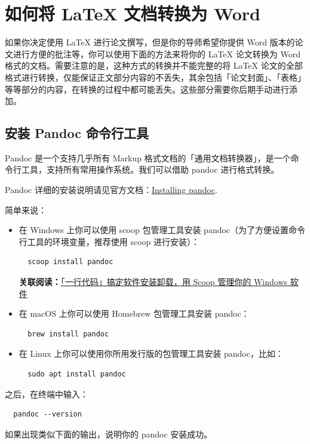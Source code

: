 \section{如何将 {\LaTeX} 文档转换为 Word}

如果你决定使用 {\LaTeX} 进行论文撰写，但是你的导师希望你提供 Word 版本的论文进行方便的批注等，你可以使用下面的方法来将你的 {\LaTeX} 论文转换为 Word 格式的文档。需要注意的是，这种方式的转换并不能完整的将 {\LaTeX} 论文的全部格式进行转换，仅能保证正文部分内容的不丢失，其余包括「论文封面」、「表格」等等部分的内容，在转换的过程中都可能丢失。这些部分需要你后期手动进行添加。

\subsection{安装 Pandoc 命令行工具}

Pandoc 是一个支持几乎所有 Markup 格式文档的「通用文档转换器」，是一个命令行工具，支持所有常用操作系统。我们可以借助 pandoc 进行格式转换。

Pandoc 详细的安装说明请见官方文档：\href{https://pandoc.org/installing.html}{Installing pandoc}.

简单来说：

\begin{itemize}
  \item 在 Windows 上你可以使用 scoop 包管理工具安装 pandoc（为了方便设置命令行工具的环境变量，推荐使用 scoop 进行安装）：
  \begin{verbatim}
  scoop install pandoc
  \end{verbatim}
  \textbf{关联阅读：}\href{https://sspai.com/post/52496}{「一行代码」搞定软件安装卸载，用 Scoop 管理你的 Windows 软件}
  \item 在 macOS 上你可以使用 Homebrew 包管理工具安装 pandoc：
  \begin{verbatim}
  brew install pandoc
  \end{verbatim}
  \item 在 Linux 上你可以使用你所用发行版的包管理工具安装 pandoc，比如：
  \begin{verbatim}
  sudo apt install pandoc
  \end{verbatim}
\end{itemize}

之后，在终端中输入：
\begin{verbatim}
  pandoc --version
\end{verbatim}

如果出现类似下面的输出，说明你的 pandoc 安装成功。

